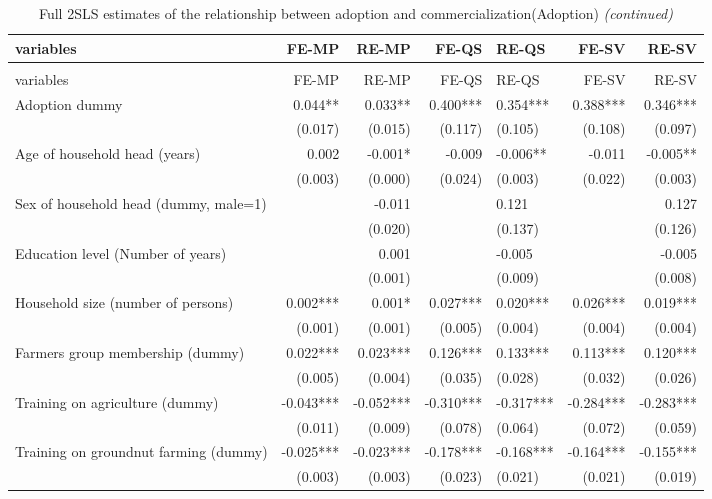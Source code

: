 \documentclass[
]{article}
\begin{document}
\begin{longtable}[t]{lrrrlrr}
\caption{\label{tab:unnamed-chunk-7}Full 2SLS estimates of the relationship between adoption and commercialization(Adoption)}\\
\toprule
variables & FE-MP & RE-MP & FE-QS & RE-QS & FE-SV & RE-SV\\
\midrule
\endfirsthead
\caption[]{\label{tab:unnamed-chunk-7}Full 2SLS estimates of the relationship between adoption and commercialization(Adoption) \textit{(continued)}}\\
\toprule
variables & FE-MP & RE-MP & FE-QS & RE-QS & FE-SV & RE-SV\\
\midrule
\endhead

\endfoot
\bottomrule
\endlastfoot
Adoption dummy & 0.044** & 0.033** & 0.400*** & 0.354*** & 0.388*** & 0.346***\\
 & (0.017) & (0.015) & (0.117) & (0.105) & (0.108) & (0.097)\\
Age of household head (years) & 0.002 & -0.001* & -0.009 & -0.006** & -0.011 & -0.005**\\
 & (0.003) & (0.000) & (0.024) & (0.003) & (0.022) & (0.003)\\
Sex of household head (dummy, male=1) &  & -0.011 &  & 0.121 &  & 0.127\\
\addlinespace
 &  & (0.020) &  & (0.137) &  & (0.126)\\
Education level (Number of years) &  & 0.001 &  & -0.005 &  & -0.005\\
 &  & (0.001) &  & (0.009) &  & (0.008)\\
Household size (number of persons) & 0.002*** & 0.001* & 0.027*** & 0.020*** & 0.026*** & 0.019***\\
 & (0.001) & (0.001) & (0.005) & (0.004) & (0.004) & (0.004)\\
\addlinespace
Farmers group membership (dummy) & 0.022*** & 0.023*** & 0.126*** & 0.133*** & 0.113*** & 0.120***\\
 & (0.005) & (0.004) & (0.035) & (0.028) & (0.032) & (0.026)\\
Training on agriculture (dummy) & -0.043*** & -0.052*** & -0.310*** & -0.317*** & -0.284*** & -0.283***\\
 & (0.011) & (0.009) & (0.078) & (0.064) & (0.072) & (0.059)\\
Training on groundnut farming (dummy) & -0.025*** & -0.023*** & -0.178*** & -0.168*** & -0.164*** & -0.155***\\
\addlinespace
 & (0.003) & (0.003) & (0.023) & (0.021) & (0.021) & (0.019)\\

\end{longtable}
\end{document}

